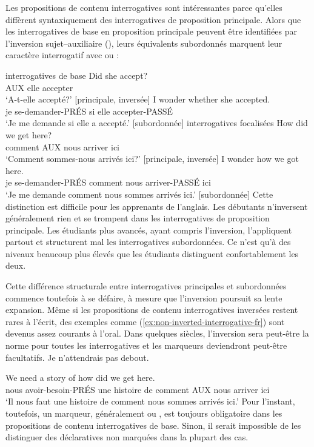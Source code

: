 \label{sec:sub-interrog-fr}

Les propositions de contenu interrogatives sont intéressantes parce qu'elles diffèrent syntaxiquement des interrogatives de proposition principale. Alors que les interrogatives de base en proposition principale peuvent être identifiées par l'inversion sujet--auxiliaire (), leurs équivalents subordonnés marquent leur caractère interrogatif avec  ou :

\ea interrogatives de base\label{ex:int-sub-fr}
    \ea \gll Did she accept?\\
        AUX elle accepter\\
    \glt `A-t-elle accepté?' [principale, inversée]
    \ex \gll I wonder {\ob}whether she accepted{\cb}.\\
        je se-demander-PRÉS si elle accepter-PASSÉ\\
    \glt `Je me demande si elle a accepté.' [subordonnée]
    \z
\z
\ea interrogatives focalisées
    \ea \gll How did we get here?\\
        comment AUX nous arriver ici\\
    \glt `Comment sommes-nous arrivés ici?' [principale, inversée]
    \ex \gll I wonder {\ob}how we got here{\cb}.\\
        je se-demander-PRÉS comment nous arriver-PASSÉ ici\\
    \glt `Je me demande comment nous sommes arrivés ici.' [subordonnée]
    \z
\z
Cette distinction est difficile pour les apprenants de l'anglais. Les débutants n'inversent généralement rien et se trompent dans les interrogatives de proposition principale. Les étudiants plus avancés, ayant compris l'inversion, l'appliquent partout et structurent mal les interrogatives subordonnées. Ce n'est qu'à des niveaux beaucoup plus élevés que les étudiants distinguent confortablement les deux.

Cette différence structurale entre interrogatives principales et subordonnées commence toutefois à se défaire, à mesure que l'inversion poursuit sa lente expansion. Même si les propositions de contenu interrogatives inversées restent rares à l'écrit, des exemples comme (\ref{ex:non-inverted-interrogative-fr}) sont devenus assez courants à l'oral. Dans quelques siècles, l'inversion sera peut-être la norme pour toutes les interrogatives et les marqueurs deviendront peut-être facultatifs. Je n'attendrais pas debout.

\ea\label{ex:non-inverted-interrogative-fr}
\gll We need a story of {\ob}how did we get here{\cb}.\\
    nous avoir-besoin-PRÉS une histoire de comment AUX nous arriver ici\\
\glt `Il nous faut une histoire de comment nous sommes arrivés ici.'
\z
Pour l'instant, toutefois, un marqueur, généralement  ou , est toujours obligatoire dans les propositions de contenu interrogatives de base. Sinon, il serait impossible de les distinguer des déclaratives non marquées dans la plupart des cas.

